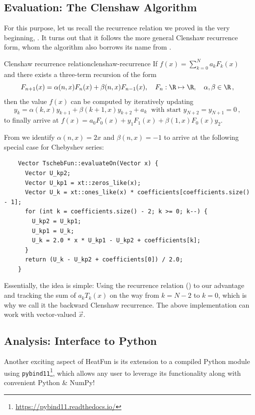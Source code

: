 \documentclass[12pt, a4paper]{article}
\newcommand{\chebyshev}{Chebyshev\xspace}
\newcommand{\heatfun}{\textcolor{themecolor3}{HeatFun}\xspace}
\begin{document}
  \subsection{Evaluation: The Clenshaw Algorithm}
  For this purpose, let us recall the recurrence relation we proved in the very beginning, .
  It turns out that it follows the more general Clenshaw recurrence form, whom the algorithm also borrows its name from \parencite[172-178]{art-of-sci-comp}.
  \begin{theorem}{Clenshaw recurrence relation}{clenshaw-recurrence}
    If $f(x) = \sum_{k=0}^N a_k F_k(x)$ and there exists a three-term recursion of the form
    $$F_{n+1}(x)=\alpha(n,x) F_n(x) + \beta(n,x) F_{n-1}(x),\quad F_n: \R \mapsto \R, \quad \alpha, \beta \in \R \,,$$
    then the value $f(x)$ can be computed by iteratively updating
    $$y_k = \alpha(k,x)y_{k+1}+\beta(k+1,x)y_{k+2}+a_k \; \text{ with start } y_{N+2} = y_{N+1} = 0\,,$$
    to finally arrive at $f(x) = a_0F_0(x)+y_1F_1(x)+\beta(1,x)F_0(x)y_2$.
  \end{theorem}

  From  we identify $\alpha(n, x) = 2x$ and $\beta(n, x) = -1$ to arrive at the following special case for \chebyshev series:
  \begin{verbatim}
    Vector TschebFun::evaluateOn(Vector x) {
      Vector U_kp2;
      Vector U_kp1 = xt::zeros_like(x);
      Vector U_k = xt::ones_like(x) * coefficients[coefficients.size() - 1];
      for (int k = coefficients.size() - 2; k >= 0; k--) {
        U_kp2 = U_kp1;
        U_kp1 = U_k;
        U_k = 2.0 * x * U_kp1 - U_kp2 + coefficients[k];
      }
      return (U_k - U_kp2 + coefficients[0]) / 2.0;
    }
  \end{verbatim}

  Essentially, the idea is simple: Using the recurrence relation () to our advantage and tracking the sum of $a_k T_k(x)$ on the way from $k = N-2$ to $k=0$, which is why we call it the backward Clenshaw recurrence.
  The above implementation can work with vector-valued $\vec{x}$.

  \subsection{Analysis: Interface to Python}
  Another exciting aspect of \heatfun is its extension to a compiled Python module using \texttt{pybind11}\footnote{\url{https://pybind11.readthedocs.io/}}, which allows any user to leverage its functionality along with convenient Python \& NumPy!
\end{document}
